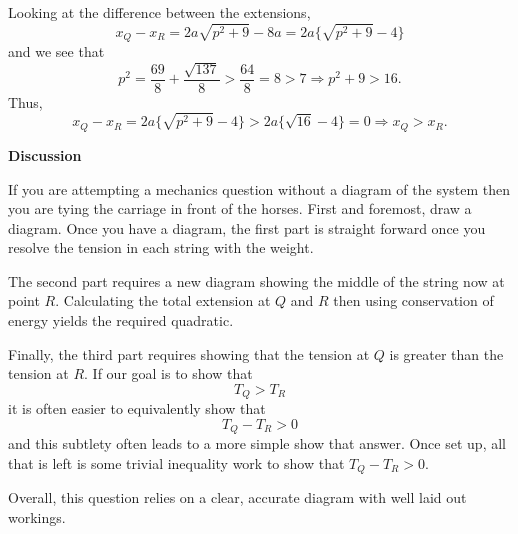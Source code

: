 \documentclass{article}
\begin{document}
\quad Looking at the difference between the extensions,
\[
x_Q-x_R = 2a\sqrt{p^2+9} - 8a = 2a\{\sqrt{p^2+9}-4\}
\]
and we see that 
\[
p^2 = \frac{69}{8} + \frac{\sqrt{137}}{8} > \frac{64}{8} = 8 >7 \Rightarrow p^2+9>16.
\]
Thus,
\[
x_Q-x_R  = 2a\{\sqrt{p^2+9}-4\} > 2a\{\sqrt{16}-4\} = 0 \Rightarrow x_Q > x_R.
\]


\newpage

\begin{center}
    \textbf{Discussion}
\end{center}

\vspace{0.5cm}

If you are attempting a mechanics question without a diagram of the system then you are tying the carriage in front of the horses. First and foremost, draw a diagram. Once you have a diagram, the first part is straight forward once you resolve the tension in each string with the weight.\par
\quad The second part requires a new diagram showing the middle of the string now at point $R$. Calculating the total extension at $Q$ and $R$ then using conservation of energy yields the required quadratic.\par
\quad Finally, the third part requires showing that the tension at $Q$ is greater than the tension at $R$. If our goal is to show that 
\[
T_Q>T_R
\]
it is often easier to equivalently show that
\[
T_Q-T_R>0
\]
and this subtlety often leads to a more simple show that answer. Once set up, all that is left is some trivial inequality work to show that $T_Q-T_R>0$.\par
\quad Overall, this question relies on a clear, accurate diagram with well laid out workings.
\end{document}
